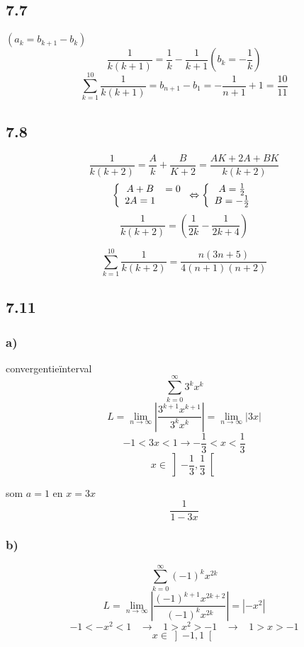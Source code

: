 \documentclass[11pt]{article}
\begin{document}
\subsection*{7.7}
$(a_k = b_{k+1}-b_k)$
\[
\frac{1}{k(k+1)} = \frac{1}{k}-\frac{1}{k+1} (b_k = -\frac{1}{k})
\]
\[
\sum_{k=1}^{10}\frac{1}{k(k+1)} = b_{n+1}-b_1 = -\frac{1}{n+1}+1 = \frac{10}{11}
\]

\subsection*{7.8}
\[
\frac{1}{k(k+2)} = \frac{A}{k} + \frac{B}{K+2}=\frac{AK+2A+BK}{k(k+2)}
\]
\[
\left\lbrace\begin{array}{c c}
A+B&=0\\
2A=1\\
\end{array}\right.
\Leftrightarrow
\left\lbrace\begin{array}{c c}
A=\frac{1}{2}\\
B=-\frac{1}{2}\\
\end{array}\right.
\]
\[
\frac{1}{k(k+2)} = \left(\frac{1}{2k}-\frac{1}{2k+4}\right)
\]

\[
\sum_{k=1}^{10}\frac{1}{k(k+2)} = \frac{n(3n+5)}{4(n+1)(n+2)}
\]

\subsection*{7.11}
\subsubsection*{a)}
convergentieïnterval
\[
\sum_{k=0}^{\infty}3^kx^k
\]
\[
L = \lim_{n\rightarrow\infty}\left|\frac{3^{k+1}x^{k+1}}{3^kx^k}\right| = \lim_{n\rightarrow\infty}\left|3x\right|
\]
\[
-1 < 3x < 1 \rightarrow -\frac{1}{3} < x < \frac{1}{3}
\]
\[
x \in \left] -\frac{1}{3},\frac{1}{3} \right[
\]

som $a=1$ en $x=3x$
\[
\frac{1}{1-3x}
\]

\subsubsection*{b)}
\[
\sum_{k=0}^\infty(-1)^kx^{2k}
\]
\[
L 
=
\lim_{n\rightarrow\infty}\left|\frac{(-1)^{k+1}x^{2k+2}}{(-1)^kx^{2k}}\right|
=
|-x^2|
\]
\[
-1 < -x^2 <1 
\;\;\;\longrightarrow\;\;\;
 1>x^2 > -1
 \;\;\;\longrightarrow\;\;\;
 1 > x > -1
\]
\[
x \in \left] -1,1 \right[
\]
\end{document}
